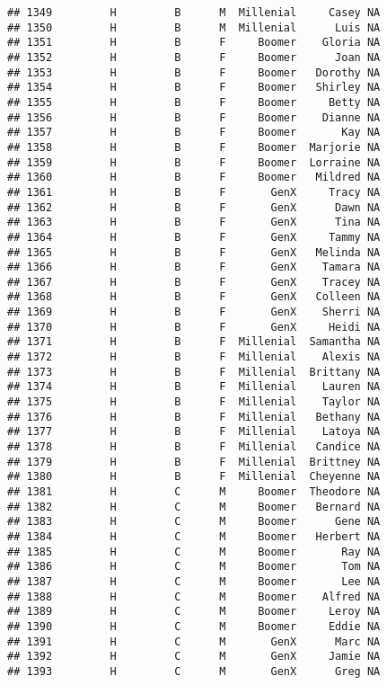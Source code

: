 \documentclass[
]{article}
\begin{document}
\begin{verbatim}
## 1349         H         B      M  Millenial     Casey NA
## 1350         H         B      M  Millenial      Luis NA
## 1351         H         B      F     Boomer    Gloria NA
## 1352         H         B      F     Boomer      Joan NA
## 1353         H         B      F     Boomer   Dorothy NA
## 1354         H         B      F     Boomer   Shirley NA
## 1355         H         B      F     Boomer     Betty NA
## 1356         H         B      F     Boomer    Dianne NA
## 1357         H         B      F     Boomer       Kay NA
## 1358         H         B      F     Boomer  Marjorie NA
## 1359         H         B      F     Boomer  Lorraine NA
## 1360         H         B      F     Boomer   Mildred NA
## 1361         H         B      F       GenX     Tracy NA
## 1362         H         B      F       GenX      Dawn NA
## 1363         H         B      F       GenX      Tina NA
## 1364         H         B      F       GenX     Tammy NA
## 1365         H         B      F       GenX   Melinda NA
## 1366         H         B      F       GenX    Tamara NA
## 1367         H         B      F       GenX    Tracey NA
## 1368         H         B      F       GenX   Colleen NA
## 1369         H         B      F       GenX    Sherri NA
## 1370         H         B      F       GenX     Heidi NA
## 1371         H         B      F  Millenial  Samantha NA
## 1372         H         B      F  Millenial    Alexis NA
## 1373         H         B      F  Millenial  Brittany NA
## 1374         H         B      F  Millenial    Lauren NA
## 1375         H         B      F  Millenial    Taylor NA
## 1376         H         B      F  Millenial   Bethany NA
## 1377         H         B      F  Millenial    Latoya NA
## 1378         H         B      F  Millenial   Candice NA
## 1379         H         B      F  Millenial  Brittney NA
## 1380         H         B      F  Millenial  Cheyenne NA
## 1381         H         C      M     Boomer  Theodore NA
## 1382         H         C      M     Boomer   Bernard NA
## 1383         H         C      M     Boomer      Gene NA
## 1384         H         C      M     Boomer   Herbert NA
## 1385         H         C      M     Boomer       Ray NA
## 1386         H         C      M     Boomer       Tom NA
## 1387         H         C      M     Boomer       Lee NA
## 1388         H         C      M     Boomer    Alfred NA
## 1389         H         C      M     Boomer     Leroy NA
## 1390         H         C      M     Boomer     Eddie NA
## 1391         H         C      M       GenX      Marc NA
## 1392         H         C      M       GenX     Jamie NA
## 1393         H         C      M       GenX      Greg NA

\end{verbatim}
\end{document}
